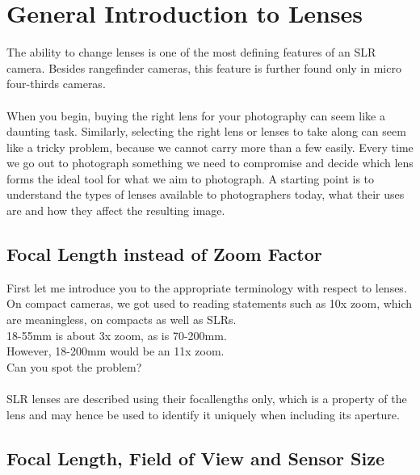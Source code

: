 \section{General Introduction to Lenses}
\label{sec:General-Introdcution-Lenses}

The ability to change lenses is one of the most defining features of an \gls{SLR} camera. Besides \gls{rangefinder} cameras, this feature is further found only in micro four-thirds cameras.
\\
\\
When you begin, buying the right lens for your photography can seem like a daunting task. Similarly, selecting the right lens or lenses to take along can seem like a tricky problem, because we cannot carry more than a few easily. Every time we go out to photograph something we need to compromise and decide which lens forms the ideal tool for what we aim to photograph. A starting point is to understand the types of lenses available to photographers today, what their uses are and how they affect the resulting image.

\subsection{Focal Length instead of Zoom Factor}

First let me introduce you to the appropriate terminology with respect to lenses. On compact cameras, we got used to reading statements such as 10x zoom, which are meaningless, on compacts as well as \glspl{SLR}.
\\
18-55mm is about 3x zoom, as is 70-200mm.
\\
However, 18-200mm would be an 11x zoom.
\\
Can you spot the problem?
\\
\\
\gls{SLR} lenses are described using their \glspl{focallength} only, which is a property of the lens and may hence be used to identify it uniquely when including its \gls{aperture}.

\subsection{Focal Length, Field of View and Sensor Size}


